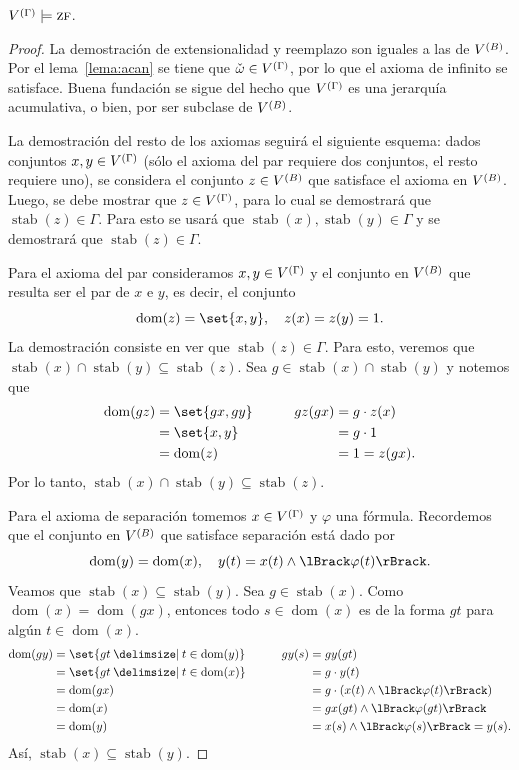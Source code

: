 \documentclass[letterpaper,DIV=15,12pt]{scrartcl}
\DeclarePairedDelimiter{\vb}{\lBrack}{\rBrack}             %
\DeclareMathOperator{\dom}{dom}                            %
\DeclareMathOperator{\stab}{stab}                          %
\newcommand{\st}{}
\newcommand{\SetSymbol}[1][]{%
\nonscript\:#1\vert
\allowbreak
\nonscript\:
\mathopen{}}
\renewcommand\st{\SetSymbol[\delimsize]}
\begin{document}
\begin{theorem}
    \(\mg\models\text{\textsc{zf}}\).
\end{theorem}
\begin{proof}
    La
    demostración de extensionalidad y reemplazo son iguales a las de \(\mb\).
    Por el lema~\ref{lema:acan} se tiene que \(\check{\omega}\in\mg\), por lo
    que el axioma de infinito se satisface. Buena fundación se sigue del hecho
    que \(\mg\) es una jerarquía acumulativa, o bien, por ser subclase de
    \(\mb\).

    La demostración del resto de los axiomas seguirá el siguiente esquema: dados
    conjuntos \(x,y\in\mg\) (sólo el axioma del par requiere dos conjuntos, el
    resto requiere uno), se considera el conjunto \(z\in\mb\) que satisface el
    axioma en \(\mb\). Luego, se debe mostrar que \(z\in\mg\), para lo cual se
    demostrará que \(\stab(z)\in\Gamma\). Para esto se usará que
    \(\stab(x),\stab(y)\in\Gamma\) y se demostrará que \(\stab(z)\in\Gamma\).

    Para el axioma del par consideramos \(x,y\in\mg\) y el conjunto en \(\mb\)
    que resulta ser el par de \(x\) e \(y\), es decir, el conjunto
    \begin{equation*}
        \dom(z)=\set{x,y}, \quad z(x)=z(y)=1.
    \end{equation*}
    La demostración consiste en ver que \(\stab(z)\in\Gamma\). Para esto,
    veremos que \(\stab(x)\cap\stab(y)\subseteq\stab(z)\). Sea
    \(g\in\stab(x)\cap\stab(y)\) y notemos que
    \begin{alignat*}{2}
        \dom(gz)&=\set{gx,gy} &\qquad gz(gx)&=g\cdot z(x)\\
        &=\set{x,y} & &=g\cdot 1\\
        &=\dom(z) & &=1=z(gx).
    \end{alignat*}
    Por lo tanto, \(\stab(x)\cap\stab(y)\subseteq\stab(z)\).

    Para el axioma de separación tomemos \(x\in\mg\) y \(\varphi\) una fórmula.
    Recordemos que el conjunto en \(\mb\) que satisface separación está dado por
    \begin{equation*}
        \dom(y)=\dom(x), \quad y(t)=x(t)\land\vb{\varphi(t)}.
    \end{equation*}
    Veamos que \(\stab(x)\subseteq\stab(y)\). Sea \(g\in\stab(x)\). Como
    \(\dom(x)=\dom(gx)\), entonces todo \(s\in\dom(x)\) es de la forma \(gt\)
    para algún \(t\in\dom(x)\).
    \begin{alignat*}{2}
        \dom(gy)&=\set{gt\st t\in\dom(y)} &\qquad gy(s)&=gy(gt)\\
        &=\set{gt\st t\in\dom(x)} & &=g\cdot y(t)\\
        &=\dom(gx) & &=g\cdot(x(t)\land\vb{\varphi(t)})\\
        &=\dom(x) & &=gx(gt)\land\vb{\varphi(gt)}\\
        &=\dom(y) & &=x(s)\land\vb{\varphi(s)}=y(s).
    \end{alignat*}
    Así, \(\stab(x)\subseteq\stab(y)\).
    

\end{proof}
\end{document}
